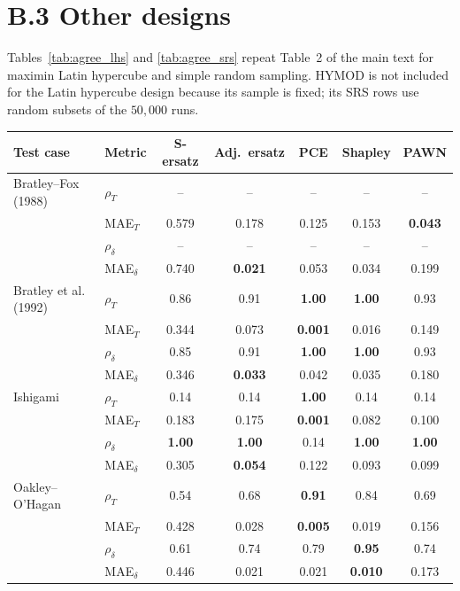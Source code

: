 \documentclass[11pt,a4paper]{article}
\begin{document}
\section*{B.3 Other designs}

Tables~\ref{tab:agree_lhs} and \ref{tab:agree_srs} repeat Table~2 of the main text for maximin Latin hypercube and simple random sampling. HYMOD is not included for the Latin hypercube design because its sample is fixed; its SRS rows use random subsets of the $50{,}000$ runs.

\begin{table}[H]\centering\footnotesize
\begin{tabular}{@{}llccccc@{}}\toprule
Test case & Metric & S-ersatz & Adj.\ ersatz & PCE & Shapley & PAWN \\ \midrule
Bratley--Fox (1988) & $\rho_T$ & -- & -- & -- & -- & -- \\
 & MAE$_T$ & 0.579 & 0.178 & 0.125 & 0.153 & \textbf{0.043} \\
 & $\rho_\delta$ & -- & -- & -- & -- & -- \\
 & MAE$_\delta$ & 0.740 & \textbf{0.021} & 0.053 & 0.034 & 0.199 \\
\addlinespace[2pt]
Bratley et al. (1992) & $\rho_T$ & 0.86 & 0.91 & \textbf{1.00} & \textbf{1.00} & 0.93 \\
 & MAE$_T$ & 0.344 & 0.073 & \textbf{0.001} & 0.016 & 0.149 \\
 & $\rho_\delta$ & 0.85 & 0.91 & \textbf{1.00} & \textbf{1.00} & 0.93 \\
 & MAE$_\delta$ & 0.346 & \textbf{0.033} & 0.042 & 0.035 & 0.180 \\
\addlinespace[2pt]
Ishigami & $\rho_T$ & 0.14 & 0.14 & \textbf{1.00} & 0.14 & 0.14 \\
 & MAE$_T$ & 0.183 & 0.175 & \textbf{0.001} & 0.082 & 0.100 \\
 & $\rho_\delta$ & \textbf{1.00} & \textbf{1.00} & 0.14 & \textbf{1.00} & \textbf{1.00} \\
 & MAE$_\delta$ & 0.305 & \textbf{0.054} & 0.122 & 0.093 & 0.099 \\
\addlinespace[2pt]
Oakley--O'Hagan & $\rho_T$ & 0.54 & 0.68 & \textbf{0.91} & 0.84 & 0.69 \\
 & MAE$_T$ & 0.428 & 0.028 & \textbf{0.005} & 0.019 & 0.156 \\
 & $\rho_\delta$ & 0.61 & 0.74 & 0.79 & \textbf{0.95} & 0.74 \\
 & MAE$_\delta$ & 0.446 & 0.021 & 0.021 & \textbf{0.010} & 0.173 \\

\end{tabular}
\end{table}
\end{document}
